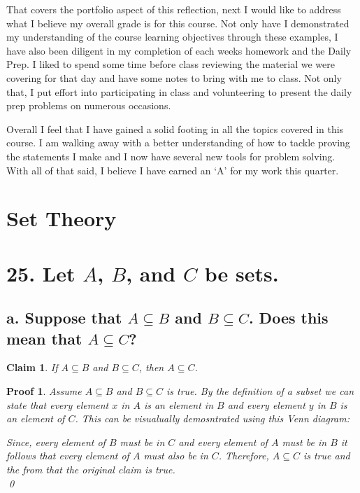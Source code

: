 \documentclass{article}
\newtheorem*{claim}{Claim}
\newtheorem*{poof}{Proof}
\begin{document}
That covers the portfolio aspect of this reflection, next I would like to address what I believe my overall grade is for this course. Not only have I demonstrated my understanding of the course learning objectives through these examples, I have also been diligent in my completion of each weeks homework and the Daily Prep. I liked to spend some time before class reviewing the material we were covering for that day and have some notes to bring with me to class. Not only that, I put effort into participating in class and volunteering to present the daily prep problems on numerous occasions.

Overall I feel that I have gained a solid footing in all the topics covered in this course. I am walking away with a better understanding of how to tackle proving the statements I make and I now have several new tools for problem solving. With all of that said, I believe I have earned an `A' for my work this quarter.

\newpage
\section*{Set Theory}
\section*{25. Let $A$, $B$, and $C$ be sets.}
\subsection*{a. Suppose that $A \subseteq B$ and $B \subseteq C$. Does this mean that $A \subseteq C$?}
\begin{claim}
    If $A \subseteq B$ and $B \subseteq C$, then $A \subseteq C$.
\end{claim}
\begin{poof}
    Assume $A \subseteq B$ and $B \subseteq C$ is true. By the definition of a subset we can state that every element $x$ in $A$ is an element in $B$ and every element $y$ in $B$ is an element of $C$. This can be visualually demosntrated using this Venn diagram:
    \begin{center}
    \end{center}
    Since, every element of $B$ must be in $C$ and every element of $A$ must be in $B$ it follows that every element of $A$ must also be in $C$. Therefore, $A \subseteq C$ is true and the  from that the original claim is true. \\
    \qed
\end{poof}
\end{document}
